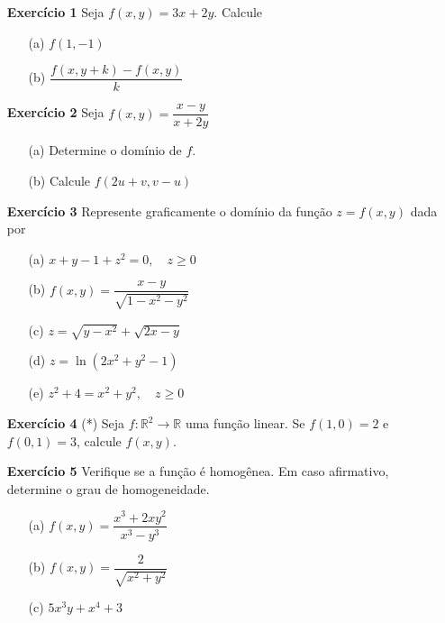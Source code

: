 \begin{enumerate}
    \item[\textbf{Exercício 1}] Seja $f(x,y) = 3x + 2y$. Calcule 
    \begin{enumerate}
        \item[(a)] $f(1,-1)$ 
        \item[(b)] $\dfrac{f(x, y+k) - f(x,y)}{k}$ 
    \end{enumerate}

    \item[\textbf{Exercício 2}] Seja $f(x,y) = \dfrac{x-y}{x+2y}$ 
    \begin{enumerate}
        \item[(a)] Determine o domínio de $f$. 
        \item[(b)] Calcule $f(2u+v, v-u)$ 
    \end{enumerate}

    \item[\textbf{Exercício 3}] Represente graficamente o domínio da função $z = f(x,y)$ dada por 
    \begin{enumerate}
        \item[(a)] $x + y - 1 + z^2 = 0, \quad z \ge 0$ 
        \item[(b)] $f(x,y) = \dfrac{x-y}{\sqrt{1 - x^2 - y^2}}$ 
        \item[(c)] $z = \sqrt{y - x^2} + \sqrt{2x - y}$ 
        \item[(d)] $z = \ln(2x^2 + y^2 - 1)$ 
        \item[(e)] $z^2 + 4 = x^2 + y^2, \quad z \ge 0$ 
    \end{enumerate}

    \item[\textbf{Exercício 4}] (*) Seja $f:\mathbb{R}^2 \rightarrow \mathbb{R}$ uma função linear. Se $f(1,0) = 2$ e $f(0,1) = 3$, calcule $f(x,y)$. 

    \item[\textbf{Exercício 5}] Verifique se a função é homogênea. Em caso afirmativo, determine o grau de homogeneidade. 
    \begin{enumerate}
        \item[(a)] $f(x,y) = \dfrac{x^3 + 2xy^2}{x^3 - y^3}$ 
        \item[(b)] $f(x,y) = \dfrac{2}{\sqrt{x^2 + y^2}}$
        \item[(c)] $5x^3y + x^4 + 3$
    \end{enumerate}


\end{enumerate}

